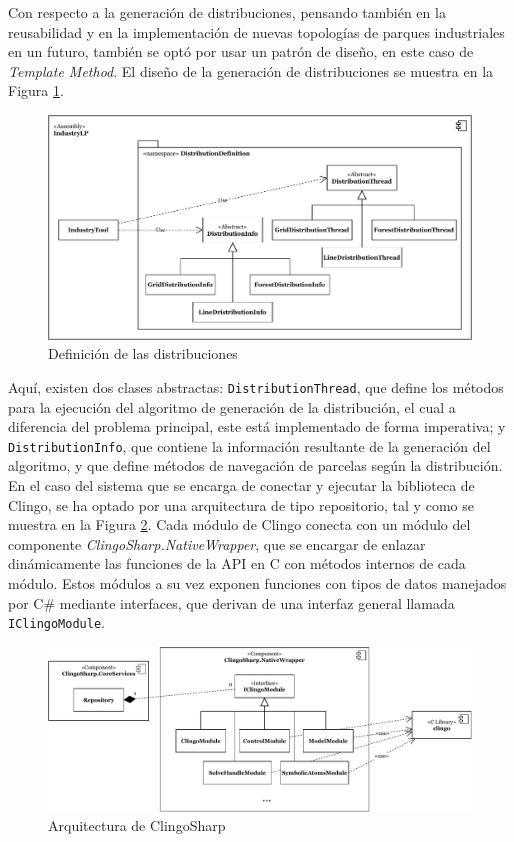 Con respecto a la generación de distribuciones, pensando también en la reusabilidad y en la implementación de nuevas topologías de parques industriales en un futuro, también se optó por usar un patrón de diseño, en este caso de \textit{Template Method}. El diseño de la generación de distribuciones se muestra en la Figura \ref{fig:distributions}.

\begin{figure}[!h]
	\centering
	\includegraphics[width=\textwidth]{images/distribuciones}
	\caption{Definición de las distribuciones}
	\label{fig:distributions}
\end{figure}

Aquí, existen dos clases abstractas: \texttt{DistributionThread}, que define los métodos para la ejecución del algoritmo de generación de la distribución, el cual a diferencia del problema principal, este está implementado de forma imperativa; y \texttt{DistributionInfo}, que contiene la información resultante de la generación del algoritmo, y que define métodos de navegación de parcelas según la distribución. \\

En el caso del sistema que se encarga de conectar y ejecutar la biblioteca de Clingo, se ha optado por una arquitectura de tipo repositorio, tal y como se muestra en la Figura \ref{fig:clingosharp-repository}. Cada módulo de Clingo conecta con un módulo del componente \textit{ClingoSharp.NativeWrapper}, que se encargar de enlazar dinámicamente las funciones de la API en C con métodos internos de cada módulo. Estos módulos a su vez exponen funciones con tipos de datos manejados por C\# mediante interfaces, que derivan de una interfaz general llamada \texttt{IClingoModule}.

\begin{figure}[!h]
	\centering
	\includegraphics[width=\textwidth]{images/repository}
	\caption{Arquitectura de ClingoSharp}
	\label{fig:clingosharp-repository}
\end{figure}


